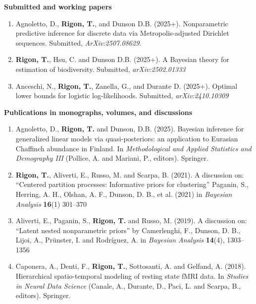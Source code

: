 \documentclass[10pt]{article}
\begin{document}
\textbf{Submitted and working papers}
\begin{enumerate}
\setcounter{enumi}{\value{publications}}

\item Agnoletto, D., \textbf{Rigon, T.}, and Dunson D.B. (2025+). Nonparametric predictive inference for discrete data via Metropolis-adjusted Dirichlet sequences. Submitted, \emph{ArXiv:2507.08629}.

\item \textbf{Rigon, T.}, Hsu, C. and Dunson D.B. (2025+). A Bayesian theory for estimation of biodiversity. Submitted, \emph{arXiv:2502.01333}

\item Anceschi, N., \textbf{Rigon, T.}, Zanella, G., and Durante D. (2025+).  Optimal lower bounds for logistic log-likelihoods. Submitted, \emph{arXiv:2410.10309}

\setcounter{publications}{\value{enumi}}
\end{enumerate}

\textbf{Publications in monographs, volumes, and discussions}

\begin{enumerate}
\setcounter{enumi}{\value{publications}}

\item Agnoletto, D., \textbf{Rigon, T.} and Dunson, D.B. (2025). Bayesian inference for generalized linear models via quasi-posteriors: an application to Eurasian Chaffinch abundance in Finland. In \emph{Methodological and Applied Statistics and Demography III} (Pollice, A. and Mariani, P., editors). Springer. 

\item \textbf{Rigon, T.}, Aliverti, E., Russo, M. and Scarpa, B. (2021). A discussion on: ``Centered partition processes: Informative priors for clustering'' Paganin, S., Herring, A. H., Olshan, A. F., Dunson, D. B., et al. (2021) in \textit{Bayesian Analysis} \textbf{16}(1) 301--370

\item Aliverti, E., Paganin, S., \textbf{Rigon, T.} and Russo, M. (2019). A discussion on: ``Latent nested nonparametric priors'' by Camerlenghi, F., Dunson, D. B., Lijoi, A., Pr\"unster, I. and Rodr\'iguez, A. in \textit{Bayesian Analysis} \textbf{14}(4), 1303--1356

\item Caponera, A., Denti, F., \textbf{Rigon, T.}, Sottosanti, A. and Gelfand, A. (2018). Hierarchical spatio-temporal modeling of resting state fMRI data. In \emph{Studies in Neural Data Science} (Canale, A., Durante, D., Paci, L. and Scarpa, B., editors). Springer.
\setcounter{publications}{\value{enumi}}
\end{enumerate}
\end{document}
